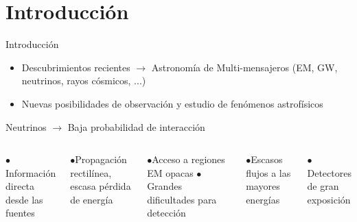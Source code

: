 \documentclass{beamer}
\begin{document}
	\section{Introducción}
	\begin{frame}{Introducción}
		\begin{itemize}
			\item Descubrimientos recientes $\rightarrow$ Astronomía de Multi-mensajeros (EM, GW, neutrinos, rayos cósmicos, ...)
			\item Nuevas posibilidades de observación y estudio de fenómenos astrofísicos
		\end{itemize}
		\pause\begin{block}{\centering Neutrinos $\rightarrow$ Baja probabilidad de interacción}

		\begin{columns}
			\centering
			$\bullet$Información directa desde las fuentes
			
			$\bullet$Propagación rectilínea, escasa pérdida de energía
			
			$\bullet$Acceso a regiones EM opacas
			\centering
			$\bullet$Grandes dificultades para detección
			
			$\bullet$Escasos flujos a las mayores energías
			
			$\bullet$Detectores de gran exposición
		\end{columns}
		\end{block}
	\end{frame}
\end{document}
